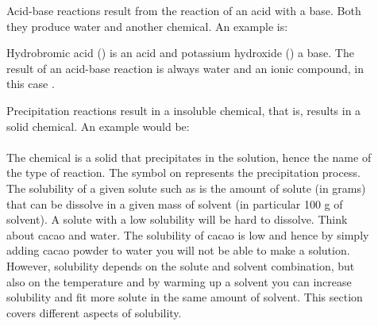\documentclass[main.tex]{subfiles}
\begin{document}
\begin{description}
\item[] Acid-base reactions result from the reaction of an acid with a base. Both they produce water and another chemical. An example is:
\begin{center}\end{center}
Hydrobromic acid () is an acid and potassium hydroxide () a base.
The result of an acid-base reaction is always water and an ionic compound, in this case .

\item[] Precipitation reactions result in a insoluble chemical, that is, results in a solid chemical. An example would be:\\
\\
The chemical  is a solid that precipitates in the solution, hence the name of the type of reaction. The symbol on  represents the precipitation process. The solubility of a given solute such as  is the amount of solute (in grams) that can be dissolve in a given mass of solvent (in particular 100 g of solvent). A solute with a low solubility will be hard to dissolve. Think about cacao and water. The solubility of cacao is low and hence by simply adding cacao powder to water you will not be able to make a solution. However, solubility depends on the solute and solvent combination, but also on the temperature and by warming up a solvent you can increase solubility and fit more solute in the same amount of solvent. This section covers different aspects of solubility.


\end{description}
\end{document}
